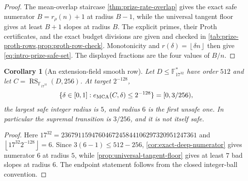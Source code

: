 \documentclass[11pt,a4paper]{amsart}
\numberwithin{equation}{section}
\newtheorem{corollary}[corollary]{Corollary}
\theoremstyle{remark}
\DeclareMathOperator{\RS}{RS}
\newcommand{\F}{\mathbb F}
\newcommand{\floor}[1]{\left\lfloor #1\right\rfloor}
\begin{document}
\begin{proof}
The mean-overlap staircase
\cref{thm:prize-rate-overlap} gives the exact safe numerator
\(B=r_\rho(n)+1\) at radius \(B-1\), while the universal tangent
floor gives at least \(B+1\) slopes at radius \(B\).  The explicit primes,
their Proth certificates, and the exact budget divisions are given and
checked in \cref{tab:prize-proth-rows,prop:proth-row-check}.  Monotonicity
and \(r(\delta)=\floor{\delta n}\) then give
\eqref{eq:intro-prize-safe-set}.  The displayed fractions are the four
values of \(B/n\).
\end{proof}

\begin{corollary}[An extension-field smooth row]
\label{cor:intro-f17-row}
Let \(D\le\F_{17^{32}}^*\) have order \(512\) and let
\(C=\RS_{\F_{17^{32}}}(D,256)\).  At target \(2^{-128}\),
\[
 \{\delta\in[0,1]:e_{\rm MCA}(C,\delta)\le2^{-128}\}
   =[0,3/256),
\]
the largest safe integer radius is \(5\), and radius \(6\) is the first
unsafe one.  In particular the supremal transition is \(3/256\), and it
is not itself safe.
\end{corollary}

\begin{proof}
Here
\(17^{32}=2367911594760467245844106297320951247361\) and
\(\floor{17^{32}2^{-128}}=6\).  Since
\(3(6-1)\le512-256\),
\cref{cor:exact-deep-numerator} gives numerator \(6\) at radius \(5\),
while \cref{prop:universal-tangent-floor} gives at least \(7\) bad slopes
at radius \(6\).  The endpoint statement follows from the closed
integer-ball convention.
\end{proof}
\end{document}
